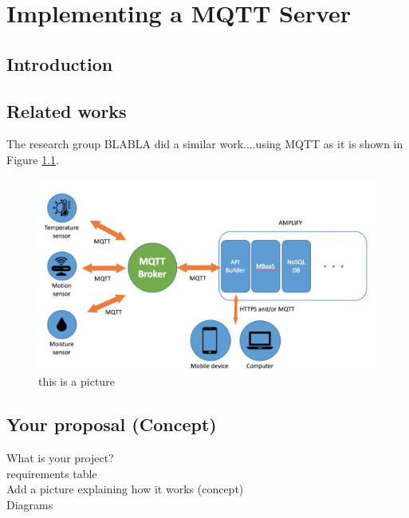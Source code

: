 \chapter{Implementing a MQTT Server}
\label{intro} 



\section{Introduction}
\label{sec:1}


\section{Related works}
\label{sec:2}

The research group BLABLA \cite{cheng2015building} did a similar work....using MQTT as it is shown in Figure \ref{fig:1}.
\begin{figure}
\sidecaption
\includegraphics[scale=.09]{images/figure.png}
\caption{this is a picture}
\label{fig:1}
\end{figure}


\section{Your proposal (Concept)}
\label{sec:3}
   What is your project?
\\ requirements table
\\ Add a picture explaining how it works (concept)
\\ Diagrams
\\

